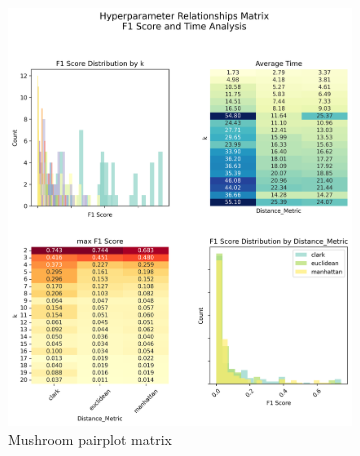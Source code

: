 \begin{figure}[H]
    \centering
    \begin{subfigure}{0.49\textwidth}
        \centering
        \includegraphics[width=\linewidth]{figures/mushroom_hyperparameter_pairplot_matrix.png}
        \caption{Mushroom pairplot matrix}
    \end{subfigure}
    \hfill
    \begin{subfigure}{0.49\textwidth}
        \centering

\end{subfigure}
\end{figure}
